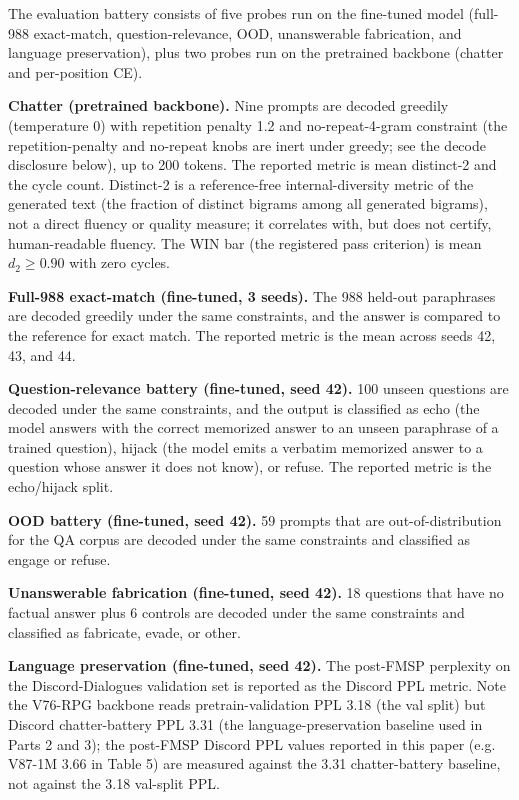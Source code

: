 \documentclass[11pt]{article}
\begin{document}
The evaluation battery consists of five probes run on the fine-tuned model (full-988 exact-match, question-relevance, OOD, unanswerable fabrication, and language preservation), plus two probes run on the pretrained backbone (chatter and per-position CE).

\textbf{Chatter (pretrained backbone).} Nine prompts are decoded greedily (temperature 0) with repetition penalty 1.2 and no-repeat-4-gram constraint (the repetition-penalty and no-repeat knobs are inert under greedy; see the decode disclosure below), up to 200 tokens. The reported metric is mean distinct-2 and the cycle count. Distinct-2 is a reference-free internal-diversity metric of the generated text (the fraction of distinct bigrams among all generated bigrams), not a direct fluency or quality measure; it correlates with, but does not certify, human-readable fluency. The WIN bar (the registered pass criterion) is mean $d_2 \geq 0.90$ with zero cycles.

\textbf{Full-988 exact-match (fine-tuned, 3 seeds).} The 988 held-out paraphrases are decoded greedily under the same constraints, and the answer is compared to the reference for exact match. The reported metric is the mean across seeds 42, 43, and 44.

\textbf{Question-relevance battery (fine-tuned, seed 42).} 100 unseen questions are decoded under the same constraints, and the output is classified as echo (the model answers with the correct memorized answer to an unseen paraphrase of a trained question), hijack (the model emits a verbatim memorized answer to a question whose answer it does not know), or refuse. The reported metric is the echo/hijack split.

\textbf{OOD battery (fine-tuned, seed 42).} 59 prompts that are out-of-distribution for the QA corpus are decoded under the same constraints and classified as engage or refuse.

\textbf{Unanswerable fabrication (fine-tuned, seed 42).} 18 questions that have no factual answer plus 6 controls are decoded under the same constraints and classified as fabricate, evade, or other.

\textbf{Language preservation (fine-tuned, seed 42).} The post-FMSP perplexity on the Discord-Dialogues validation set is reported as the Discord PPL metric. Note the V76-RPG backbone reads pretrain-validation PPL 3.18 (the val split) but Discord chatter-battery PPL 3.31 (the language-preservation baseline used in Parts 2 and 3); the post-FMSP Discord PPL values reported in this paper (e.g. V87-1M 3.66 in Table 5) are measured against the 3.31 chatter-battery baseline, not against the 3.18 val-split PPL.
\end{document}
